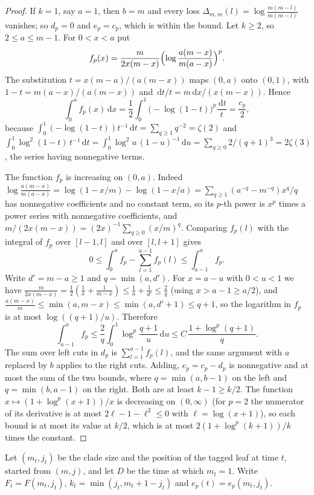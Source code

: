 \documentclass[11pt]{amsart}
\theoremstyle{remark}
\numberwithin{equation}{section}
\newcommand{\dd}{\,\mathrm d}
\begin{document}
\begin{proof}
If $k=1$, say $a=1$, then $b=m$ and every loss $\Delta_{m,m}(l)=\log\frac{m(m-l)}{m(m-l)}$ vanishes; so $d_p=0$ and $e_p=c_p$, which is within the bound. Let $k\ge2$, so $2\le a\le m-1$. For $0<x<a$ put
\[
f_p(x)=\frac{m}{2x(m-x)}\Bigl(\log\frac{a(m-x)}{m(a-x)}\Bigr)^p .
\]
The substitution $t=x(m-a)/(a(m-x))$ maps $(0,a)$ onto $(0,1)$, with $1-t=m(a-x)/(a(m-x))$ and $\dd t/t=m\dd x/(x(m-x))$. Hence
\begin{equation}\label{eq:int}
\int_0^af_p(x)\dd x=\frac12\int_0^1\bigl(-\log(1-t)\bigr)^p\frac{\dd t}{t}=\frac{c_p}2 ,
\end{equation}
because $\int_0^1(-\log(1-t))t^{-1}\dd t=\sum_{q\ge1}q^{-2}=\zeta(2)$ and $\int_0^1\log^2(1-t)\,t^{-1}\dd t=\int_0^1\log^2u\,(1-u)^{-1}\dd u=\sum_{q\ge0}2/(q+1)^3=2\zeta(3)$, the series having nonnegative terms.

The function $f_p$ is increasing on $(0,a)$. Indeed $\log\frac{a(m-x)}{m(a-x)}=\log(1-x/m)-\log(1-x/a)=\sum_{q\ge1}(a^{-q}-m^{-q})x^q/q$ has nonnegative coefficients and no constant term, so its $p$-th power is $x^p$ times a power series with nonnegative coefficients, and $m/(2x(m-x))=(2x)^{-1}\sum_{q\ge0}(x/m)^q$. Comparing $f_p(l)$ with the integral of $f_p$ over $[l-1,l]$ and over $[l,l+1]$ gives
\[
0\le\int_0^af_p-\sum_{l=1}^{a-1}f_p(l)\le\int_{a-1}^af_p .
\]
Write $d'=m-a\ge1$ and $q=\min(a,d')$. For $x=a-u$ with $0<u<1$ we have $\frac{m}{2x(m-x)}=\frac12(\frac1x+\frac1{m-x})\le\frac1a+\frac1{d'}\le\frac2q$ (using $x>a-1\ge a/2$), and $\frac{a(m-x)}{m}\le\min(a,m-x)\le\min(a,d'+1)\le q+1$, so the logarithm in $f_p$ is at most $\log((q+1)/u)$. Therefore
\[
\int_{a-1}^af_p\le\frac2q\int_0^1\log^p\frac{q+1}u\dd u\le C\,\frac{1+\log^p(q+1)}{q}.
\]
The sum over left cuts in $d_p$ is $\sum_{l=1}^{a-1}f_p(l)$, and the same argument with $a$ replaced by $b$ applies to the right cuts. Adding, $e_p=c_p-d_p$ is nonnegative and at most the sum of the two bounds, where $q=\min(a,b-1)$ on the left and $q=\min(b,a-1)$ on the right. Both are at least $k-1\ge k/2$. The function $x\mapsto(1+\log^p(x+1))/x$ is decreasing on $(0,\infty)$ (for $p=2$ the numerator of its derivative is at most $2\ell-1-\ell^2\le0$ with $\ell=\log(x+1)$), so each bound is at most its value at $k/2$, which is at most $2(1+\log^p(k+1))/k$ times the constant.
\end{proof}

Let $(m_t,j_t)$ be the clade size and the position of the tagged leaf at time $t$, started from $(m,j)$, and let $D$ be the time at which $m_t=1$. Write $F_t=F(m_t,j_t)$, $k_t=\min(j_t,m_t+1-j_t)$ and $e_p(t)=e_p(m_t,j_t)$.
\end{document}
